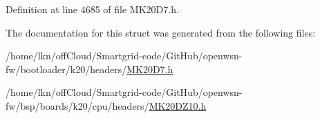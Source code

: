 Definition at line 4685 of file M\+K20\+D7.\+h.



The documentation for this struct was generated from the following files\+:\begin{DoxyCompactItemize}
\item 
/home/lkn/off\+Cloud/\+Smartgrid-\/code/\+Git\+Hub/openwsn-\/fw/bootloader/k20/headers/\hyperlink{bootloader_2k20_2headers_2_m_k20_d7_8h}{M\+K20\+D7.\+h}\item 
/home/lkn/off\+Cloud/\+Smartgrid-\/code/\+Git\+Hub/openwsn-\/fw/bsp/boards/k20/cpu/headers/\hyperlink{_m_k20_d_z10_8h}{M\+K20\+D\+Z10.\+h}\end{DoxyCompactItemize}
